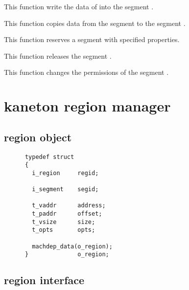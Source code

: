 	 {
	   This function write the data of  into the
	   segment .
	 }

	 {
	   This function copies data from the segment  to
	   the segment .
	 }

	 {
	   This function reserves a segment with specified properties.
	 }

	 {
	   This function releases the segment .
	 }

	 {
	   This function changes the permissions of the segment .
	 }

\section*{kaneton region manager}

\subsection*{region object}

\begin{verbatim}
      typedef struct
      {
        i_region     regid;

        i_segment    segid;

        t_vaddr      address;
        t_paddr      offset;
        t_vsize      size;
        t_opts       opts;

        machdep_data(o_region);
      }              o_region;
\end{verbatim}

\subsection*{region interface}

